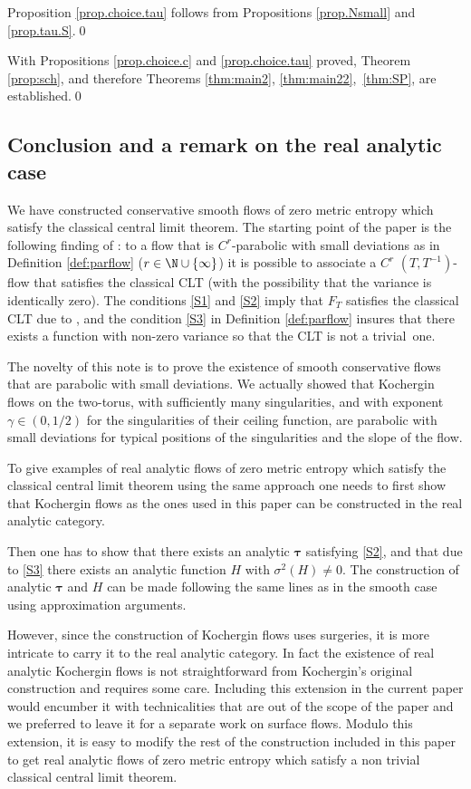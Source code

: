 \documentclass[10pt]{amsart}
\newcommand\btau{{\boldsymbol{\tau}}}
\theoremstyle{definition}
\theoremstyle{plain}
\begin{document}
Proposition \ref{prop.choice.tau}
follows from Propositions \ref{prop.Nsmall} and
\ref{prop.tau.S}.\qed

\smallskip
With Propositions \ref{prop.choice.c} and
\ref{prop.choice.tau} proved, Theorem \ref{prop:sch}, and therefore Theorems \ref{thm:main2}, \ref{thm:main22},~\ref{thm:SP}, are established.\qed

\subsection*{Conclusion and a remark on the real analytic case}

We have constructed conservative smooth flows of zero
metric entropy which satisfy the classical central limit theorem. The starting point of the paper is the following finding of \cite{DDKN}: to a flow that is $C^r$-parabolic with small deviations as in Definition \ref{def:parflow} ($r\in \N \cup \{\infty\}$) it is possible to associate a $C^r$ $(T,T^{-1})$-flow that satisfies the classical CLT (with the possibility that the variance is identically zero). The conditions \eqref{S1} and \eqref{S2} imply that $F_T$ satisfies the classical CLT due to
\cite[Th.\,3.2]{DDKN}, and
the condition \eqref{S3} in Definition \ref{def:parflow} insures that there exists a function with non-zero variance so that the CLT is not a trivial~one.

The novelty of this note is to prove the existence of smooth conservative flows that are parabolic with small deviations. We actually showed that Kochergin flows on the two-torus, with sufficiently many singularities, and with exponent $\gamma\in (0,1/2)$ for the singularities of their ceiling function, are parabolic with small deviations for typical positions of the singularities and the slope of the flow.

To give examples of real analytic flows of zero
metric entropy which satisfy the classical central limit theorem using the same approach one needs to first show that Kochergin flows as the ones used in this paper can be constructed in the real analytic category.

Then one has to show that there exists an analytic $\btau$ satisfying \eqref{S2}, and that due to \eqref{S3} there exists an analytic function $H$ with $\sigma^2(H)\neq 0$.
The construction of analytic $\btau$ and $H$ can be made following the same lines as in the smooth case using approximation arguments.

However, since the construction of Kochergin flows uses surgeries, it is more intricate to carry it to the real analytic category. In fact the existence of real analytic Kochergin flows is not straightforward from Kochergin's original construction and requires some care. Including this extension in the current paper would encumber it with technicalities that are out of the scope of the paper and we preferred to leave it for a separate work on surface flows. Modulo this extension, it is easy to modify the rest of the construction included in this paper to get real analytic flows of zero
metric entropy which satisfy a non trivial classical central limit
theorem.
\end{document}
